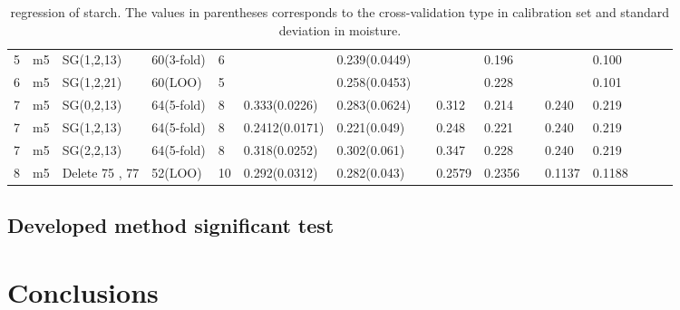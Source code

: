 \documentclass[a4paper,12pt,titlepage]{article} %
\numberwithin{equation}{section}  %
\begin{document}
\begin{landscape}
\begin{table}[]
\begin{tabular}{llllllllllllllll}
				5                    & m5                   & SG(1,2,13)           & 60(3-fold) & 6  &                & 0.239(0.0449) &   &        & 0.196  &   &        & 0.100          &         &    &               \\
				6                    & m5                   & SG(1,2,21)           & 60(LOO)    & 5  &                & 0.258(0.0453) &   &        & 0.228  &   &        & 0.101          &         &    &               \\
				7                    & m5                   & SG(0,2,13)           & 64(5-fold) & 8  & 0.333(0.0226)  & 0.283(0.0624) &   & 0.312  & 0.214  &   & 0.240  & 0.219          &         &    &               \\
				7                    & m5                   & SG(1,2,13)           & 64(5-fold) & 8  & 0.2412(0.0171) & 0.221(0.049)  &   & 0.248  & 0.221  &   & 0.240  & 0.219          &         &    &               \\
				7                    & m5                   & SG(2,2,13)           & 64(5-fold) & 8  & 0.318(0.0252)  & 0.302(0.061)  &   & 0.347  & 0.228  &   & 0.240  & 0.219          &         &    &               \\
				8                    & m5                   & Delete 75 , 77       & 52(LOO)    & 10 & 0.292(0.0312)  & 0.282(0.043)  &   & 0.2579 & 0.2356 &   & 0.1137 & 0.1188         &         &    &               
			\end{tabular}
			
			\caption{regression of starch. The values in parentheses corresponds to the cross-validation type in calibration set and standard deviation in moisture.}
			\label{tab:starch}
		\end{table}
	\end{landscape}
	
	
	
	\subsection{Developed method significant test}
	\label{sec: test}
	
	
	
	\section{Conclusions}
	\label{sec:conclution}
	
	
	
	
	
	
	
	
	
\end{document}
